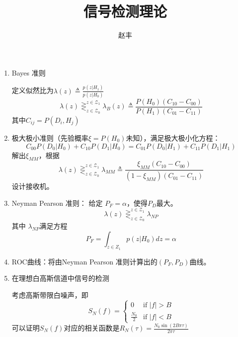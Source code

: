 \documentclass{article}
\begin{document}
\title{信号检测理论}
\author{赵丰}
\maketitle
\begin{enumerate}
\item Bayes 准则

定义似然比为$\lambda(z) \triangleq \frac{p(z|H_1)}{p(z|H_0)}$
\begin{equation}
\lambda(z)\mathop{\gtreqless}_{z\in \mathcal{Z}_0}^{z\in \mathcal{Z}_1} \lambda_B(z)\triangleq \frac{P(H_0)(C_{10}-C_{00})}{P(H_1)(C_{01}-C_{11})}
\end{equation}
其中$C_{ij}=P(D_i,H_j)$

\item 极大极小准则（先验概率$\xi=P(H_0)$未知），满足极大极小化方程：
\begin{equation}
C_{00}P(D_0|H_0)+C_{10}P(D_1|H_0)=C_{01}P(D_0|H_1)+C_{11}P(D_1|H_1)
\end{equation}
解出$\xi_{MM}$，根据
\begin{equation}
\lambda(z)\mathop{\gtreqless}^{z\in \mathcal{Z}_1}_{z \in \mathcal{Z}_0} \lambda_{MM} \triangleq \frac{\xi_{MM}(C_{10}-C_{00})}{(1-\xi_{MM})(C_{01}-C_{11})}
\end{equation}
设计接收机。
\item Neyman Pearson 准则：
给定 $P_F=\alpha$，使得$P_D$最大。
\begin{equation}
\lambda(z)\mathop{\gtreqless}^{z\in \mathcal{Z}_1}_{z \in \mathcal{Z}_0} 
\lambda_{NP}
\end{equation}
其中 $\lambda_{NP}$满足方程
\begin{equation}
P_F=\int_{z\in Z_1}p(z|H_0)dz=\alpha
\end{equation}

\item ROC曲线：将由Neyman Pearson 准则计算出的$(P_F,P_D)$曲线。

\item 在理想白高斯信道中信号的检测

考虑高斯带限白噪声，即
\begin{equation}
S_N(f)=\begin{cases}
0 & \textrm{if } |f|>B\\
\frac{N_0}{2} & \textrm{if } |f|<B
\end{cases}
\end{equation}
可以证明$S_N(f)$对应的相关函数是$R_N(\tau)=\frac{N_0\sin(2B\pi \tau)}{2\pi \tau}$


\end{enumerate}
\end{document}
